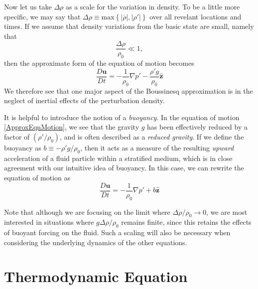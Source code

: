 \documentclass[letterpaper, 11pt]{article}
\begin{document}
Now let us take $\Delta \rho$ as a scale for the variation in density. To be a little more specific, we may say that $\Delta \rho \equiv \textrm{max}\left\{ |\overline{\rho}|, |\rho'| \right\}$ over all revelant locations and times. If we assume that density variations from the basic state are small, namely that
\begin{equation}
\frac{\Delta \rho}{\rho_0} \ll 1,
\end{equation}
then the approximate form of the equation of motion becomes
\begin{equation}\label{ApproxEqnMotion}
\frac{D \bm{u}}{D t} = - \frac{1}{\rho_0} \nabla p' - \frac{\rho' g}{\rho_0} \hat{\bm{z}}
\end{equation}
We therefore see that one major aspect of the Boussinesq approximation is in the neglect of inertial effects of the perturbation density.

It is helpful to introduce the notion of a \textit{buoyancy}. In the equation of motion \eqref{ApproxEqnMotion}, we see that the gravity $g$ has been effectively reduced by a factor of $(\rho' / \rho_0)$, and is often described as a \emph{reduced gravity}. If we define the buoyancy as $b \equiv -\rho' g / \rho_0$, then it acts as a measure of the resulting \textit{upward} acceleration of a fluid particle within a stratified medium, which is in close agreement with our intuitive idea of buoyancy. In this case, we can rewrite the equation of motion as
\begin{equation}\label{BsqEqnMotion}
\frac{D \bm{u}}{D t} = -\frac{1}{\rho_0} \nabla p' + b \hat{\bm{z}}
\end{equation}

Note that although we are focusing on the limit where $\Delta \rho / \rho_0 \rightarrow 0$, we are most interested in situations where $g \Delta \rho / \rho_0$ remains finite, since this retains the effects of buoyant forcing on the fluid. Such a scaling will also be necessary when considering the underlying dynamics of the other equations.


\section{Thermodynamic Equation}
\end{document}
